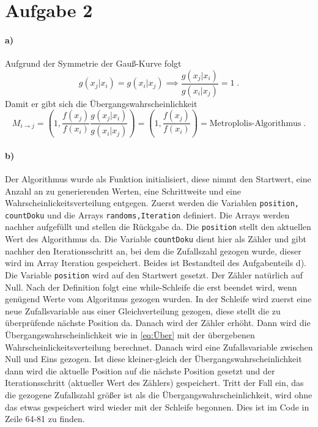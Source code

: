 \section{Aufgabe 2}
\label{sec:Aufgabe2}
\paragraph{a)}
Aufgrund der Symmetrie der Gauß-Kurve folgt
\begin{equation}
g(x_j \vert x_i) = g(x_i \vert x_j) \implies \frac{g(x_j \vert x_i)}{g(x_i \vert x_j)} = 1 \; .
\end{equation}
Damit er gibt sich die Übergangswahrscheinlichkeit
\begin{equation}
M_{i \rightarrow j} = \left(1 , \frac{f(x_j)}{f(x_i)} \frac{g(x_j \vert x_i)}{g(x_i \vert x_j)} \right) = \left(1 , \frac{f(x_j)}{f(x_i)} \right) = \text{Metroplolis-Algorithmus} \; .
\label{eq:Über}
\end{equation}
\paragraph{b)}
Der Algorithmus wurde als Funktion initialisiert, diese nimmt den Startwert, eine Anzahl an
zu generierenden Werten, eine Schrittweite und eine Wahrscheinlickeitsverteilung entgegen.
Zuerst werden die Variablen \texttt{position, countDoku} und die Arrays \texttt{randoms,Iteration}
definiert. Die Arrays werden nachher aufgefüllt und stellen die Rückgabe da. Die \texttt{position}
stellt den aktuellen Wert des Algorithmus da. Die Variable \texttt{countDoku} dient hier als
Zähler und gibt nachher den Iterationsschritt an, bei dem die Zufallszahl gezogen wurde, dieser
wird im Array Iteration gespeichert. Beides ist Bestandteil des Aufgabenteils d).
Die Variable \texttt{position} wird auf den Startwert gesetzt. Der Zähler natürlich auf Null.
Nach der Definition folgt eine while-Schleife die erst beendet wird, wenn genügend Werte vom
Algoritmus gezogen wurden. In der Schleife wird zuerst eine neue Zufallsvariable aus einer
Gleichverteilung gezogen, diese stellt die zu überprüfende nächste Position da.
Danach wird der Zähler erhöht.
Dann wird die Übergangswahrscheinlichkeit wie in \eqref{eq:Über}
mit der übergebenen Wahrscheinlickeitsverteilung berechnet. Danach wird eine Zufallsvariable
zwischen Null und Eins gezogen. Ist diese kleiner-gleich der Übergangswahrscheinlichkeit
dann wird die aktuelle Position auf die nächste Position gesetzt und der Iterationsschritt
(aktueller Wert des Zählers) gespeichert. Tritt der Fall ein, das die gezogene Zufallszahl größer
ist als die Übergangswahrscheinlichkeit, wird ohne das etwas gespeichert wird wieder mit der
Schleife begonnen.
Dies ist im Code in Zeile 64-81 zu finden.
%
